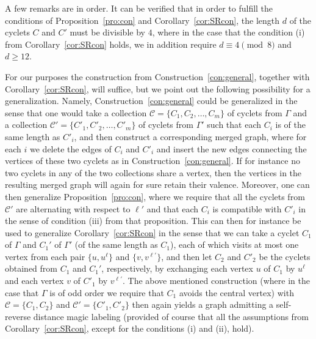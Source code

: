 \documentclass[11 pt,english]{article}
\newcommand{\G}{\Gamma}
\theoremstyle{definition}
\begin{document}
A few remarks are in order. It can be verified that in order to fulfill the conditions of Proposition~\ref{pro:con} and Corollary~\ref{cor:SRcon}, the length $d$ of the cyclets $C$ and $C'$ must be divisible by $4$, where in the case that the condition (i) from Corollary~\ref{cor:SRcon} holds, we in addition require $d \equiv 4 \pmod{8}$ and $d \geq 12$. 

For our purposes the construction from Construction~\ref{con:general}, together with Corollary~\ref{cor:SRcon}, will suffice, but we point out the following possibility for a generalization. Namely, Construction~\ref{con:general} could be generalized in the sense that one would take a collection $\mathcal{C} = \{C_1, C_2, \ldots , C_m\}$ of cyclets from $\G$ and a collection $\mathcal{C}' = \{C'_1, C'_2, \ldots , C'_m\}$ of cyclets from $\G'$ such that each $C_i$ is of the same length as $C'_i$, and then construct a corresponding merged graph, where for each $i$ we delete the edges of $C_i$ and $C'_i$ and insert the new edges connecting the vertices of these two cyclets as in Construction~\ref{con:general}. If for instance no two cyclets in any of the two collections share a vertex, then the vertices in the resulting merged graph will again for sure retain their valence. Moreover, one can then generalize Proposition~\ref{pro:con}, where we require that all the cyclets from $\mathcal{C}'$ are alternating with respect to $\ell'$ and that each $C_i$ is compatible with $C'_i$ in the sense of condition (iii) from that proposition. This can then for instance be used to generalize Corollary~\ref{cor:SRcon} in the sense that we can take a cyclet $C_1$ of $\G$ and $C_1'$ of $\G'$ (of the same length as $C_1$), each of which visits at most one vertex from each pair $\{u, u^\ell\}$ and $\{v, v^{\ell'}\}$, and then let $C_2$ and $C'_2$ be the cyclets obtained from $C_1$ and $C_1'$, respectively, by exchanging each vertex $u$ of $C_1$ by $u^\ell$ and each vertex $v$ of $C'_1$ by $v^{\ell'}$. The above mentioned construction (where in the case that $\G$ is of odd order we require that $C_1$ avoids the central vertex) with $\mathcal{C} = \{C_1, C_2\}$ and $\mathcal{C'} = \{C'_1, C'_2\}$ then again yields a graph admitting a self-reverse distance magic labeling (provided of course that all the assumptions from Corollary~\ref{cor:SRcon}, except for the conditions (i) and (ii), hold).
\end{document}
